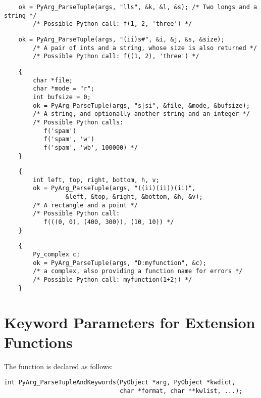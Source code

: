 \begin{verbatim}
    ok = PyArg_ParseTuple(args, "lls", &k, &l, &s); /* Two longs and a string */
        /* Possible Python call: f(1, 2, 'three') */
\end{verbatim}

\begin{verbatim}
    ok = PyArg_ParseTuple(args, "(ii)s#", &i, &j, &s, &size);
        /* A pair of ints and a string, whose size is also returned */
        /* Possible Python call: f((1, 2), 'three') */
\end{verbatim}

\begin{verbatim}
    {
        char *file;
        char *mode = "r";
        int bufsize = 0;
        ok = PyArg_ParseTuple(args, "s|si", &file, &mode, &bufsize);
        /* A string, and optionally another string and an integer */
        /* Possible Python calls:
           f('spam')
           f('spam', 'w')
           f('spam', 'wb', 100000) */
    }
\end{verbatim}

\begin{verbatim}
    {
        int left, top, right, bottom, h, v;
        ok = PyArg_ParseTuple(args, "((ii)(ii))(ii)",
                 &left, &top, &right, &bottom, &h, &v);
        /* A rectangle and a point */
        /* Possible Python call:
           f(((0, 0), (400, 300)), (10, 10)) */
    }
\end{verbatim}

\begin{verbatim}
    {
        Py_complex c;
        ok = PyArg_ParseTuple(args, "D:myfunction", &c);
        /* a complex, also providing a function name for errors */
        /* Possible Python call: myfunction(1+2j) */
    }
\end{verbatim}


\section{Keyword Parameters for Extension Functions
         \label{parseTupleAndKeywords}}


The  function is declared as
follows:

\begin{verbatim}
int PyArg_ParseTupleAndKeywords(PyObject *arg, PyObject *kwdict,
                                char *format, char **kwlist, ...);
\end{verbatim}


